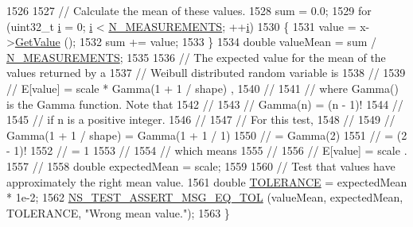 \begin{DoxyCode}
1526 
1527   \textcolor{comment}{// Calculate the mean of these values.}
1528   sum = 0.0;
1529   \textcolor{keywordflow}{for} (uint32\_t \hyperlink{bernuolliDistribution_8m_a6f6ccfcf58b31cb6412107d9d5281426}{i} = 0; \hyperlink{bernuolliDistribution_8m_a6f6ccfcf58b31cb6412107d9d5281426}{i} < \hyperlink{classRandomVariableStreamWeibullAntitheticTestCase_a73448b454c635dea88aa423443fd0ff9}{N\_MEASUREMENTS}; ++\hyperlink{bernuolliDistribution_8m_a6f6ccfcf58b31cb6412107d9d5281426}{i})
1530     \{
1531       value = x->\hyperlink{classns3_1_1WeibullRandomVariable_af64818134b6b7734f33a81bca8d15023}{GetValue} ();
1532       sum += value;
1533     \}
1534   \textcolor{keywordtype}{double} valueMean = sum / \hyperlink{classRandomVariableStreamWeibullAntitheticTestCase_a73448b454c635dea88aa423443fd0ff9}{N\_MEASUREMENTS};
1535 
1536   \textcolor{comment}{// The expected value for the mean of the values returned by a}
1537   \textcolor{comment}{// Weibull distributed random variable is}
1538   \textcolor{comment}{//}
1539   \textcolor{comment}{//     E[value]  =  scale * Gamma(1 + 1 / shape)  ,}
1540   \textcolor{comment}{//               }
1541   \textcolor{comment}{// where Gamma() is the Gamma function.  Note that }
1542   \textcolor{comment}{//               }
1543   \textcolor{comment}{//     Gamma(n)  =  (n - 1)!}
1544   \textcolor{comment}{//               }
1545   \textcolor{comment}{// if n is a positive integer.}
1546   \textcolor{comment}{//}
1547   \textcolor{comment}{// For this test,}
1548   \textcolor{comment}{//}
1549   \textcolor{comment}{//     Gamma(1 + 1 / shape)  =  Gamma(1 + 1 / 1)}
1550   \textcolor{comment}{//                           =  Gamma(2)}
1551   \textcolor{comment}{//                           =  (2 - 1)!}
1552   \textcolor{comment}{//                           =  1}
1553   \textcolor{comment}{//}
1554   \textcolor{comment}{// which means}
1555   \textcolor{comment}{//}
1556   \textcolor{comment}{//     E[value]  =  scale  .}
1557   \textcolor{comment}{//               }
1558   \textcolor{keywordtype}{double} expectedMean = scale;
1559 
1560   \textcolor{comment}{// Test that values have approximately the right mean value.}
1561   \textcolor{keywordtype}{double} \hyperlink{spectrum-value-test_8cc_a30c17564229ec2e37dfea9c6c9ad643e}{TOLERANCE} = expectedMean * 1e-2;
1562   \hyperlink{group__testing_ga9e7861b56b4e70db3b56044cb7a28e41}{NS\_TEST\_ASSERT\_MSG\_EQ\_TOL} (valueMean, expectedMean, TOLERANCE, \textcolor{stringliteral}{"Wrong mean
       value."}); 
1563 \}
\end{DoxyCode}


